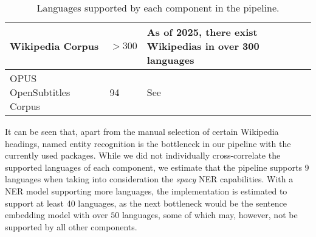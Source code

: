 {\begin{table}[H]
\begin{tabularx}{\textwidth}{|X|X|X|}
		\hline
		Wikipedia Corpus                            & $>300$                       & As of 2025, there exist Wikipedias in over 300 languages\footnotemark[8]                                                                                                                                                                   \\
		\hline
		OPUS OpenSubtitles Corpus                   & 94                           & See \footnotemark[9]                                                                                                                                                                                                                       \\
		\hline
	\end{tabularx}



	\caption{Languages supported by each component in the pipeline.}
	\label{table:supported-languages}
\end{table}
}


It can be seen that, apart from the manual selection of certain Wikipedia headings, named entity recognition is the bottleneck in our pipeline with the currently used packages.
While we did not individually cross-correlate the supported languages of each component, we estimate that the pipeline supports 9 languages when taking into consideration the \textit{spacy} NER capabilities.
With a NER model supporting more languages, the implementation is estimated to support at least 40 languages, as the next bottleneck would be the sentence embedding model with over $50$ languages, some of which may, however, not be supported by all other components.



